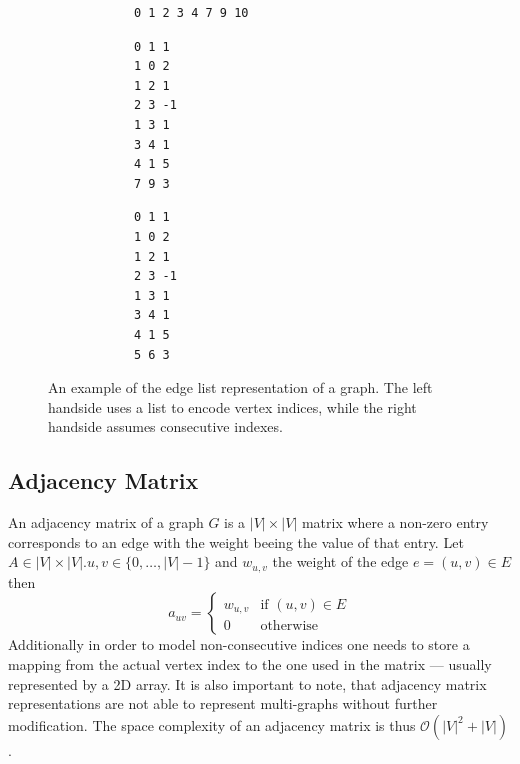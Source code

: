             \begin{figure}[htp]
            \begin{center}
            \begin{minipage}{0.5\textwidth}
            \begin{verbatim}
            0 1 2 3 4 7 9 10
            \end{verbatim}
            \begin{verbatim}
            0 1 1
            1 0 2
            1 2 1
            2 3 -1
            1 3 1
            3 4 1
            4 1 5
            7 9 3
            \end{verbatim}
            \end{minipage}%
            \hfill%
            \begin{minipage}{0.5\textwidth}
            \begin{verbatim}
            0 1 1
            1 0 2
            1 2 1
            2 3 -1
            1 3 1
            3 4 1
            4 1 5
            5 6 3
            \end{verbatim}
            \end{minipage}
            \end{center}
            \caption{%
                An example of the edge list representation of a graph.%
                The left handside uses a list to encode vertex indices, while the right handside assumes consecutive indexes.%
            }
            \label{edgelist}
            \end{figure}

        \subsection*{Adjacency Matrix}
            An adjacency matrix of a graph $G$ is a $|V|\times|V|$ matrix where a non-zero entry corresponds to an edge with the weight beeing the value of that entry. 
            Let $A \in |V|\times|V|. u, v \in \{0, \dots, |V| - 1\}$ and $w_{u,v}$ the weight of the edge $e = (u,v) \in E$ then
            \[ a_{uv} = \begin{cases}
                        w_{u,v} & \text{if } (u,v) \in E \\
                        0 & \text{otherwise}
                        \end{cases}
            \]
            Additionally in order to model non-consecutive indices one needs to store a mapping from the actual vertex index to the one used in the matrix --- usually represented by a 2D array. 
            It is also important to note, that adjacency matrix representations are not able to represent multi-graphs without further modification.
            The space complexity of an adjacency matrix is thus $\mathcal{O}(|V|^2 + |V|)$.
                    
